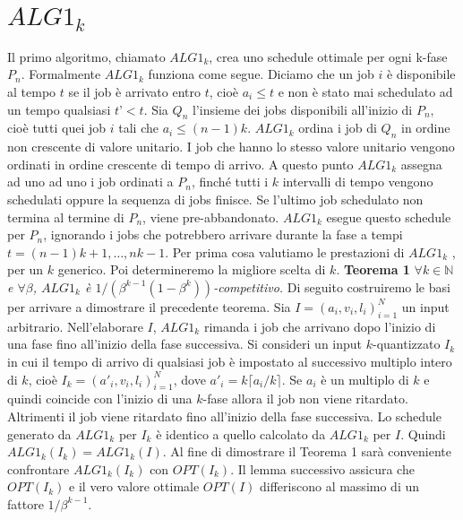 \documentclass[12pt]{article}
\newcommand*{\N}{\mathbb{N}}
\begin{document}
\section{$ALG1_{k}$}
Il primo algoritmo, chiamato $ALG1_{k}$, crea uno schedule ottimale per ogni k-fase $P_{n}$. Formalmente $ALG1_{k}$ funziona come segue. Diciamo che un job $i$ è disponibile al tempo $t$ se il job è arrivato entro $t$, cioè $a_{i} \leq t$ e non è stato mai schedulato ad un tempo qualsiasi $t’ < t$. Sia $Q_{n}$ l’insieme dei jobs disponibili all’inizio di $P_{n}$, cioè tutti quei job $i$ tali che $a_{i} \leq (n-1)k$. $ALG1_{k}$ ordina i job di $Q_{n}$ in ordine non crescente di valore unitario. I job che hanno lo stesso valore unitario vengono ordinati in ordine crescente di tempo di arrivo. A questo punto $ALG1_{k}$ assegna ad uno ad uno i job ordinati a $P_{n}$, finché tutti i $k$ intervalli di tempo vengono schedulati oppure la sequenza di jobs finisce. Se l’ultimo job schedulato non termina al termine di $P_{n}$, viene pre-abbandonato. $ALG1_{k}$ esegue questo schedule per $P_{n}$, ignorando i jobs che potrebbero arrivare durante la fase a tempi $t = (n-1)k + 1,…, nk - 1$. Per prima cosa valutiamo le prestazioni di $ALG1_{k}$ , per un $k$ generico. Poi determineremo la migliore scelta di $k$. \newline\newline
\textbf{Teorema 1} \textit{ $\forall k \in \N$ e $\forall \beta$, $ALG1_{k}$ è $1/(\beta^{k-1}(1 - \beta^{k}))$-competitivo.}\newline\newline
Di seguito costruiremo le basi per arrivare a dimostrare il precedente teorema. Sia $I=(a_{i}, v_{i}, l_{i})_{i = 1}^{N}$
un input arbitrario. Nell'elaborare $I$, $ALG1_{k}$ rimanda i job che arrivano dopo l'inizio di una fase fino all'inizio della fase successiva. Si consideri un input $k$-quantizzato $I_{k}$ in cui il tempo di arrivo di qualsiasi job è impostato al successivo multiplo intero di $k$, cioè $I_{k} = (a'_{i}, v_{i},l_{i})_{i = 1}^{N}$, dove $a'_{i} =k\lceil a_{i}/k\rceil$. Se $a_{i}$ è un multiplo di $k$ e quindi coincide con l'inizio di una $k$-fase allora il job non viene ritardato. Altrimenti il job viene ritardato fino all'inizio della fase successiva. Lo schedule generato da $ALG1_{k}$ per $I_{k}$ è identico a quello calcolato da $ALG1_{k}$ per $I$. Quindi $ALG1_{k}(I_{k}) = ALG1_{k}(I)$. Al fine di dimostrare il Teorema 1  sarà conveniente confrontare $ALG1_{k}(I_{k})$ con $OPT(I_{k})$. Il lemma successivo assicura che $OPT(I_{k})$ e il vero valore ottimale $OPT(I)$ differiscono al massimo di un fattore  $1/\beta^{k - 1}$.\newline\newline
\end{document}
